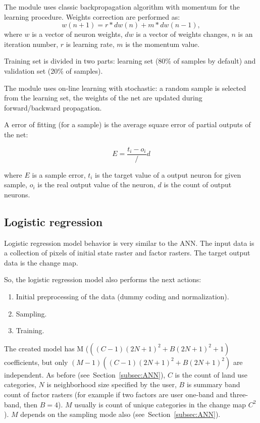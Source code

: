 \documentclass{report}
\begin{document}
The module uses classic backpropagation algorithm with momentum for the learning procedure. Weights correction are performed as:
$$
w(n+1)=r*dw(n)+m*dw(n-1),
$$
where $w$ is a vector of neuron weights, $dw$ is a vector of weights changes, $n$ is an iteration number, $r$ is learning rate, $m$ is the momentum value. 

Training set is divided in two parts: learning set (80\% of samples by default) and validation set (20\% of samples). 

The module uses on-line learning with stochastic: a random sample is selected from the learning set, the weights of the net are updated during forward/backward propagation.

A error of fitting (for a sample) is the average square error of partial outputs of the net:

$$
E = \frac{t_i - o_i}/d
$$

where $E$ is a sample error, $t_{i}$ is the target value of a output neuron for given sample, $o_{i}$ is the real output value of the neuron, $d$ is the count of output neurons. 

\subsection{Logistic regression}\label{subsec:lr}
Logistic regression model behavior is very similar to the ANN. The input data is a collection of pixels of initial state raster and factor rasters. The target output data is the change map.

So, the logistic regression model also performs the next actions: 
\begin{enumerate}
    \item Initial preprocessing of the data (dummy coding and normalization).
    \item Sampling.
    \item Training.
\end{enumerate}

The created model has M ($((C-1)(2N+1)^{2}+B(2N+1)^{2}+1)$ coefficients, but only $(M-1)((C-1)(2N+1)^{2}+B(2N+1)^{2})$ are independent. As before (see~Section~\ref{subsec:ANN}), $C$ is the count of land use categories, $N$ is neighborhood size specified by the user, $B$ is summary band count of factor rasters (for example if two factors are user one-band and three-band, then $B=4$). $M$ usually is count of unique categories in the change map $C^{2}$). $M$ depends on the sampling mode also (see~Section~\ref{subsec:ANN}). 
\end{document}
